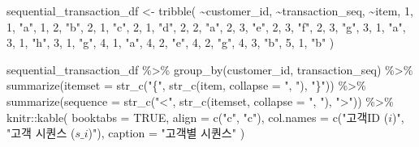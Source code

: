\documentclass[
]{book}
\newenvironment{Shaded}{\begin{snugshade}}{\end{snugshade}}
\newcommand{\AttributeTok}[1]{\textcolor[rgb]{0.77,0.63,0.00}{#1}}
\newcommand{\ConstantTok}[1]{\textcolor[rgb]{0.00,0.00,0.00}{#1}}
\newcommand{\DecValTok}[1]{\textcolor[rgb]{0.00,0.00,0.81}{#1}}
\newcommand{\FunctionTok}[1]{\textcolor[rgb]{0.00,0.00,0.00}{#1}}
\newcommand{\NormalTok}[1]{#1}
\newcommand{\OtherTok}[1]{\textcolor[rgb]{0.56,0.35,0.01}{#1}}
\newcommand{\SpecialCharTok}[1]{\textcolor[rgb]{0.00,0.00,0.00}{#1}}
\newcommand{\StringTok}[1]{\textcolor[rgb]{0.31,0.60,0.02}{#1}}
\begin{document}
\begin{Shaded}
\begin{Highlighting}[]
\NormalTok{sequential\_transaction\_df }\OtherTok{\textless{}{-}} \FunctionTok{tribble}\NormalTok{(}
  \SpecialCharTok{\textasciitilde{}}\NormalTok{customer\_id, }\SpecialCharTok{\textasciitilde{}}\NormalTok{transaction\_seq, }\SpecialCharTok{\textasciitilde{}}\NormalTok{item,}
  \DecValTok{1}\NormalTok{, }\DecValTok{1}\NormalTok{, }\StringTok{"a"}\NormalTok{,}
  \DecValTok{1}\NormalTok{, }\DecValTok{2}\NormalTok{, }\StringTok{"b"}\NormalTok{,}
  \DecValTok{2}\NormalTok{, }\DecValTok{1}\NormalTok{, }\StringTok{"c"}\NormalTok{,}
  \DecValTok{2}\NormalTok{, }\DecValTok{1}\NormalTok{, }\StringTok{"d"}\NormalTok{,}
  \DecValTok{2}\NormalTok{, }\DecValTok{2}\NormalTok{, }\StringTok{"a"}\NormalTok{,}
  \DecValTok{2}\NormalTok{, }\DecValTok{3}\NormalTok{, }\StringTok{"e"}\NormalTok{,}
  \DecValTok{2}\NormalTok{, }\DecValTok{3}\NormalTok{, }\StringTok{"f"}\NormalTok{,}
  \DecValTok{2}\NormalTok{, }\DecValTok{3}\NormalTok{, }\StringTok{"g"}\NormalTok{,}
  \DecValTok{3}\NormalTok{, }\DecValTok{1}\NormalTok{, }\StringTok{"a"}\NormalTok{,}
  \DecValTok{3}\NormalTok{, }\DecValTok{1}\NormalTok{, }\StringTok{"h"}\NormalTok{,}
  \DecValTok{3}\NormalTok{, }\DecValTok{1}\NormalTok{, }\StringTok{"g"}\NormalTok{,}
  \DecValTok{4}\NormalTok{, }\DecValTok{1}\NormalTok{, }\StringTok{"a"}\NormalTok{,}
  \DecValTok{4}\NormalTok{, }\DecValTok{2}\NormalTok{, }\StringTok{"e"}\NormalTok{,}
  \DecValTok{4}\NormalTok{, }\DecValTok{2}\NormalTok{, }\StringTok{"g"}\NormalTok{,}
  \DecValTok{4}\NormalTok{, }\DecValTok{3}\NormalTok{, }\StringTok{"b"}\NormalTok{,}
  \DecValTok{5}\NormalTok{, }\DecValTok{1}\NormalTok{, }\StringTok{"b"}
\NormalTok{)}

\NormalTok{sequential\_transaction\_df }\SpecialCharTok{\%\textgreater{}\%}
  \FunctionTok{group\_by}\NormalTok{(customer\_id, transaction\_seq) }\SpecialCharTok{\%\textgreater{}\%}
  \FunctionTok{summarize}\NormalTok{(}\AttributeTok{itemset =} \FunctionTok{str\_c}\NormalTok{(}\StringTok{"\{"}\NormalTok{, }\FunctionTok{str\_c}\NormalTok{(item, }\AttributeTok{collapse =} \StringTok{", "}\NormalTok{), }\StringTok{"\}"}\NormalTok{)) }\SpecialCharTok{\%\textgreater{}\%}
  \FunctionTok{summarize}\NormalTok{(}\AttributeTok{sequence =} \FunctionTok{str\_c}\NormalTok{(}\StringTok{"\textless{}"}\NormalTok{, }\FunctionTok{str\_c}\NormalTok{(itemset, }\AttributeTok{collapse =} \StringTok{", "}\NormalTok{), }\StringTok{"\textgreater{}"}\NormalTok{)) }\SpecialCharTok{\%\textgreater{}\%}
\NormalTok{  knitr}\SpecialCharTok{::}\FunctionTok{kable}\NormalTok{(}
    \AttributeTok{booktabs =} \ConstantTok{TRUE}\NormalTok{,}
    \AttributeTok{align =} \FunctionTok{c}\NormalTok{(}\StringTok{"c"}\NormalTok{, }\StringTok{"c"}\NormalTok{),}
    \AttributeTok{col.names =} \FunctionTok{c}\NormalTok{(}\StringTok{"고객ID ($i$)"}\NormalTok{, }\StringTok{"고객 시퀀스 ($s\_i$)"}\NormalTok{),}
    \AttributeTok{caption =} \StringTok{"고객별 시퀀스"}
\NormalTok{  )}
\end{Highlighting}
\end{Shaded}
\end{document}
